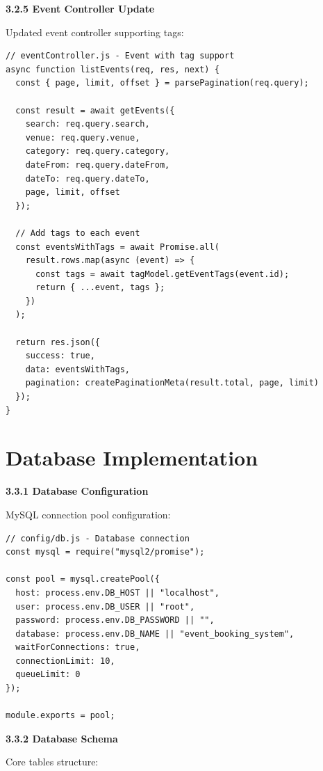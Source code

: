 \documentclass[12pt]{report}
\begin{document}
\textbf{3.2.5 Event Controller Update}

Updated event controller supporting tags:

\begin{lstlisting}
// eventController.js - Event with tag support
async function listEvents(req, res, next) {
  const { page, limit, offset } = parsePagination(req.query);
  
  const result = await getEvents({
    search: req.query.search,
    venue: req.query.venue,
    category: req.query.category,
    dateFrom: req.query.dateFrom,
    dateTo: req.query.dateTo,
    page, limit, offset
  });

  // Add tags to each event
  const eventsWithTags = await Promise.all(
    result.rows.map(async (event) => {
      const tags = await tagModel.getEventTags(event.id);
      return { ...event, tags };
    })
  );

  return res.json({
    success: true,
    data: eventsWithTags,
    pagination: createPaginationMeta(result.total, page, limit)
  });
}
\end{lstlisting}

\section{Database Implementation} 
\textbf{3.3.1 Database Configuration}

MySQL connection pool configuration:

\begin{lstlisting}
// config/db.js - Database connection
const mysql = require("mysql2/promise");

const pool = mysql.createPool({
  host: process.env.DB_HOST || "localhost",
  user: process.env.DB_USER || "root",
  password: process.env.DB_PASSWORD || "",
  database: process.env.DB_NAME || "event_booking_system",
  waitForConnections: true,
  connectionLimit: 10,
  queueLimit: 0
});

module.exports = pool;
\end{lstlisting}

\textbf{3.3.2 Database Schema}

Core tables structure:
\end{document}
